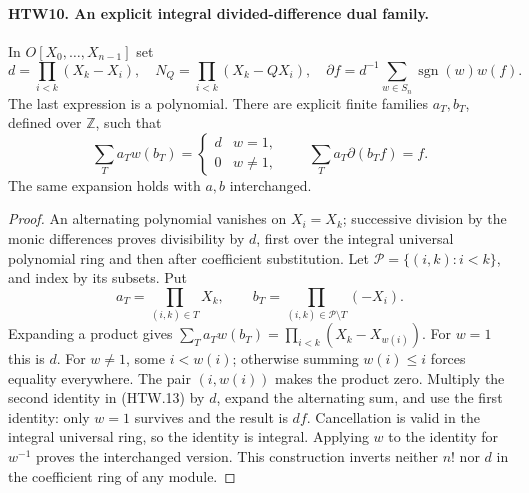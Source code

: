 \documentclass[11pt,a4paper]{article}
\numberwithin{equation}{section}
\theoremstyle{remark}\newtheorem{remark}[theorem]{Remark}
\begin{document}
\paragraph{HTW10. An explicit integral divided-difference dual family.}
\label{claim:HTW10}
In \(O[X_0,\ldots,X_{n-1}]\) set
\[
 d=\prod_{i<k}(X_k-X_i),\quad
 N_Q=\prod_{i<k}(X_k-QX_i),\quad
 \partial f=d^{-1}\sum_{w\in S_n}\operatorname{sgn}(w)w(f).
 \tag{HTW.12}
\]
The last expression is a polynomial.  There are explicit
finite families \(a_T,b_T\), defined over \(\mathbb Z\),
such that
\[
 \sum_T a_Tw(b_T)=
     \begin{cases}d&w=1,\\0&w\ne1,\end{cases}
 \qquad
 \sum_T a_T\partial(b_Tf)=f .
 \tag{HTW.13}
\]
The same expansion holds with \(a,b\) interchanged.
\begin{proof}
An alternating polynomial vanishes on \(X_i=X_k\);
successive division by the monic differences proves
divisibility by \(d\), first over the integral universal
polynomial ring and then after coefficient substitution.
Let \(\mathcal P=\{(i,k):i<k\}\), and index by its subsets.
Put
\[
 a_T=\prod_{(i,k)\in T}X_k,\qquad
 b_T=\prod_{(i,k)\in\mathcal P\setminus T}(-X_i).
\]
Expanding a product gives
\(\sum_Ta_Tw(b_T)=\prod_{i<k}(X_k-X_{w(i)})\).
For \(w=1\) this is \(d\).
For \(w\ne1\), some \(i<w(i)\); otherwise summing
\(w(i)\le i\) forces equality everywhere.  The pair
\((i,w(i))\) makes the product zero.
Multiply the second identity in (HTW.13) by \(d\),
expand the alternating sum, and use the first identity:
only \(w=1\) survives and the result is \(df\).
Cancellation is valid in the integral universal ring,
so the identity is integral.  Applying \(w\) to the
identity for \(w^{-1}\) proves the interchanged version.
This construction inverts neither \(n!\) nor \(d\)
in the coefficient ring of any module.
\end{proof}

\end{document}
